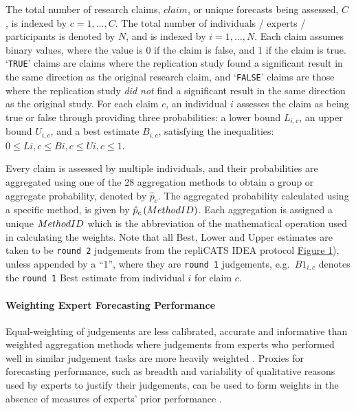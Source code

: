 \documentclass[article]{jss}
\let\oldparagraph\paragraph
\renewcommand{\paragraph}[1]{\oldparagraph{#1}\mbox{}}
\begin{document}
The total number of research claims, \(claim\), or unique forecasts
being assessed, \(C\) , is indexed by \(c = 1, ..., C\). The total
number of individuals / experts / participants is denoted by \(N\), and
is indexed by \(i = 1, ..., N\). Each claim assumes binary values, where
the value is 0 if the claim is false, and 1 if the claim is true.
`\texttt{TRUE}' claims are claims where the replication study found a
significant result in the same direction as the original research claim,
and `\texttt{FALSE}' claims are those where the replication study
\emph{did not} find a significant result in the same direction as the
original study. For each claim \(c\), an individual \(i\) assesses the
claim as being true or false through providing three probabilities: a
lower bound \({L}_{i,c}\), an upper bound \({U}_{i,c}\), and a best
estimate \(B_{i,c}\), satisfying the inequalities:
\(0 \le Li,c \le Bi,c \le Ui,c \le 1\).

Every claim is assessed by multiple individuals, and their probabilities
are aggregated using one of the 28 aggregation methods to obtain a group
or aggregate probability, denoted by \(\hat{p}_c\). The aggregated
probability calculated using a specific method, is given by
\(\hat{p}_{c}\left(Method \space ID \right)\). Each aggregation is
assigned a unique \(Method \space ID\) which is the abbreviation of the
mathematical operation used in calculating the weights. Note that all
Best, Lower and Upper estimates are taken to be \texttt{round\ 2}
judgements from the repliCATS IDEA protocol
\protect\hyperlink{fig1}{Figure 1}), unless appended by a ``1'', where
they are \texttt{round\ 1} judgements, e.g.~\(B1_{i,c}\) denotes the
\texttt{round\ 1} Best estimate from individual \(i\) for claim \(c\).

\hypertarget{weighting-expert-forecasting-performance}{%
\paragraph{Weighting Expert Forecasting
Performance}\label{weighting-expert-forecasting-performance}}

Equal-weighting of judgements are less calibrated, accurate and
informative than weighted aggregation methods where judgements from
experts who performed well in similar judgement tasks are more heavily
weighted \citep{Hanea2021}. Proxies for forecasting performance, such as
breadth and variability of qualitative reasons used by experts to
justify their judgements, can be used to form weights in the absence of
measures of experts' prior performance \citep{Hanea2021}.
\end{document}
